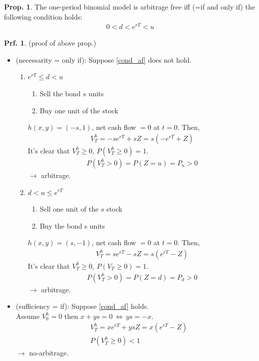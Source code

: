 \documentclass[a4paper,11pt]{jsarticle}
\theoremstyle{definition}
\newtheorem{prf}{Prf.}[subsection]
\newtheorem{prop}{Prop.}[subsection]
\begin{document}
\begin{prop}\label{prop_af}
  The one-period binomial model is arbitrage free
  iff (=if and only if) the following condition holds:
  \begin{align}\label{cond_af}
    0 < d < e^{rT} <u
  \end{align}

  \begin{prf}{(proof of above prop.)} 
    
    \begin{itemize}
      \item (necessarity = only if):
      Suppose \ref{cond_af} does not hold.
      \begin{enumerate}
        \item $e^{rT}\leq d < u$
        \begin{enumerate}
          \item Sell the bond $s$ units
          \item Buy one unit of the stock
        \end{enumerate}
        $h(x,y)=(-s,1)$, net cash flow $=0$ at $t=0$.
        Then,
        \begin{align}
          V_T^h=-se^{rT}+sZ=s(-e^{rT}+Z)
        \end{align}
        It's clear that $V_T^h \geq 0$, $P(V_T^h\geq 0)=1$.
        \begin{align}
          P(V_T^h>0)=P(Z=u)=P_u>0
        \end{align}
        $\rightarrow$ arbitrage.

        \item $d < u \leq e^{rT}$ \\
        \begin{enumerate}
          \item Sell one unit of the $s$ stock
          \item Buy the bond s units
        \end{enumerate}
        $h(x,y)=(s,-1)$, net cash flow $=0$ at $t=0$.
        Then,
        \begin{align}
          V_T^h=se^{rT}-sZ=s(e^{rT}-Z)
        \end{align}
        It's clear that $V_T^h \geq 0$, $P(V_T\geq 0)=1$.
        \begin{align}
          P(V_T^h>0)=P(Z=d)=P_d>0
        \end{align}
        $\rightarrow$ arbitrage.
      \end{enumerate}

      \item (sufficiency = if):
      Suppose \ref{cond_af} holds. \\
      Assume $V_0^h=0$ then $x+ys=0 \, \Leftrightarrow \, ys=-x$.
      \begin{align}
        &V_T^h =xe^{rT}+ysZ=x(e^{rT}-Z) \\
        &P(V_T^h\geq 0) < 1
      \end{align}
      $\rightarrow$  no-arbitrage.

    \end{itemize}
  \end{prf}

\end{prop}
\end{document}
